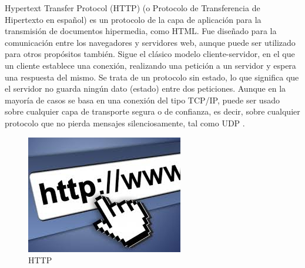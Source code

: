 		{Hypertext Transfer Protocol (HTTP) (o Protocolo de Transferencia de Hipertexto en español) es un protocolo de la capa de aplicación para la transmisión de documentos hipermedia, como HTML. Fue diseñado para la comunicación entre los navegadores y servidores web, aunque puede ser utilizado para otros propósitos también. Sigue el clásico modelo cliente-servidor, en el que un cliente establece una conexión, realizando una petición a un servidor y espera una respuesta del mismo. Se trata de un protocolo sin estado, lo que significa que el servidor no guarda ningún dato (estado) entre dos peticiones. Aunque en la mayoría de casos se basa en una conexión del tipo TCP/IP, puede ser usado sobre cualquier capa de transporte segura o de confianza, es decir, sobre cualquier protocolo que no pierda mensajes silenciosamente, tal como UDP \cite{http}.
		
		\begin{figure}[H]
			\centering
			\includegraphics[width=0.7\linewidth]{description/framework/http.jpg}
			\caption{HTTP}
		\end{figure}
		}
			
